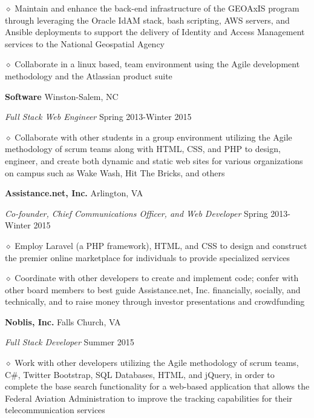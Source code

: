 \documentclass[executivepaper]{extarticle}
\begin{document}
\begin{center}
{\begin{minipage}{7.0in}
{\noindent $\diamond$ {\fontsize{9}{8}\selectfont Maintain and enhance the back-end infrastructure of the GEOAxIS program through leveraging the Oracle IdAM stack, bash scripting, AWS servers, and Ansible deployments to support the delivery of Identity and Access Management services to the National Geospatial Agency}}

{\noindent $\diamond$ {\fontsize{9}{8}\selectfont Collaborate in a linux based, team environment using the Agile development methodology and the Atlassian product suite}}

{\noindent \textbf{\fontsize{9}{8} Software}} {\hfill \fontsize{9}{8}\selectfont Winston-Salem, NC}

{\noindent \textit{\fontsize{9}{8}\selectfont Full Stack Web Engineer}} {\hfill \fontsize{9}{8}\selectfont Spring 2013-Winter 2015}

{\noindent $\diamond$ {\fontsize{9}{8}\selectfont Collaborate with other students in a group environment utilizing the Agile methodology of scrum teams along with
HTML, CSS, and PHP to design, engineer, and create both dynamic and static web sites for various organizations on campus such as Wake Wash, Hit The Bricks, and others}}

{\noindent \textbf{\fontsize{9}{8}\selectfont Assistance.net, Inc.}} {\hfill \fontsize{9}{8}\selectfont Arlington, VA}

{\noindent \textit{\fontsize{9}{8}\selectfont Co-founder, Chief Communications Officer, and Web Developer}} {\hfill \fontsize{9}{8}\selectfont Spring 2013-Winter 2015}

{\noindent $\diamond$ {\fontsize{9}{8}\selectfont Employ Laravel (a PHP framework), HTML, and CSS to design and construct the premier online marketplace for individuals to provide specialized services}}

{\noindent $\diamond$ {\fontsize{9}{8}\selectfont Coordinate with other developers to create and implement code; confer with other board members to best guide Assistance.net, Inc. financially, socially, and technically,
and to raise money through investor presentations and crowdfunding}}

{\noindent \textbf{\fontsize{9}{8}\selectfont Noblis, Inc.}} {\hfill \fontsize{9}{8}\selectfont Falls Church, VA}

{\noindent \textit{\fontsize{9}{8}\selectfont Full Stack Developer}} {\hfill \fontsize{9}{8}\selectfont Summer 2015}

{\noindent $\diamond$ {\fontsize{9}{8}\selectfont Work with other developers utilizing the Agile methodology of scrum teams, C\#, Twitter Bootstrap, SQL Databases, HTML, and jQuery, in order to complete
the base search functionality for a web-based application that allows the Federal Aviation Administration to improve the tracking capabilities for their telecommunication services}}


\end{minipage}}
\end{center}
\end{document}
